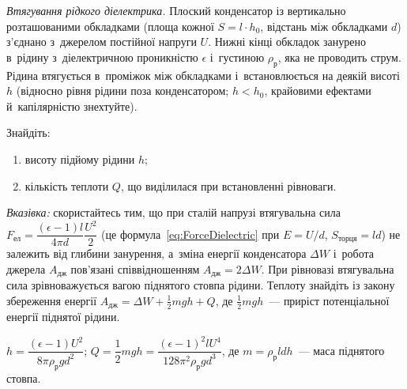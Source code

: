 \begin{problem}\label{prb:LiquidDielectricRise}
	\emph{Втягування рідкого діелектрика.} Плоский конденсатор із вертикально
	розташованими обкладками (площа кожної \(S = l\cdot h_0\), відстань між обкладками
	\(d\)) з'єднано з~джерелом постійної напруги \(U\). Нижні кінці обкладок занурено
	в~рідину з~діелектричною проникністю \(\epsilon\) і~густиною \(\rho_\text{р}\), яка не
	проводить струм. Рідина втягується в~проміжок між обкладками і~встановлюється на
	деякій висоті \(h\) (відносно рівня рідини поза конденсатором; \(h<h_0\), крайовими
	ефектами й~капілярністю знехтуйте).

	Знайдіть:
	\begin{enumerate}
		\item висоту підйому рідини \(h\);
		\item кількість теплоти \(Q\), що виділилася при встановленні рівноваги.
	\end{enumerate}

	\emph{Вказівка:} скористайтесь тим, що при сталій напрузі втягувальна сила
	\(F_{\text{ел}} = \dfrac{(\epsilon-1)l}{4\pi d}\dfrac{U^2}{2}\) (це
	формула~\eqref{eq:ForceDielectric} при \(E=U/d\), \(S_\text{торця}=ld\)) не залежить
	від глибини занурення, а~зміна енергії конденсатора \(\Delta W\) і~робота джерела
	\(A_{\text{дж}}\) пов'язані співвідношенням \(A_{\text{дж}} = 2\Delta W\). При
	рівновазі втягувальна сила зрівноважується вагою піднятого стовпа рідини. Теплоту
	знайдіть із закону збереження енергії \(A_{\text{дж}}=\Delta W+\tfrac12 mgh+Q\), де
	\(\tfrac12 mgh\)~--- приріст потенціальної енергії піднятої рідини.
	\begin{solution}
		\(h = \dfrac{(\epsilon-1)U^2}{8\pi\rho_\text{р} g d^2}\); \quad \(Q = \dfrac{1}{2}mgh = \dfrac{(\epsilon-1)^2 l U^4}{128\pi^2\rho_\text{р} g d^3}\),
		де \(m=\rho_\text{р} l d h\)~--- маса піднятого стовпа.
	\end{solution}
\end{problem}

